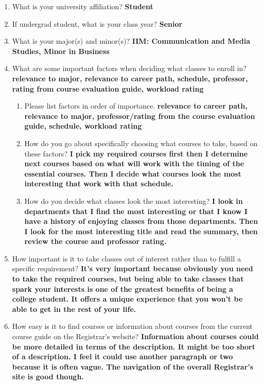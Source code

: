 \documentclass[12pt]{report}
\begin{document}
\begin{enumerate}
\item What is your university affiliation? \textbf{Student}
\item If undergrad student, what is your class year? \textbf{Senior}
\item What is your major(s) and minor(s)? \textbf{IIM: Communication and Media Studies, Minor in Business}
\item What are some important factors when deciding what classes to enroll in? \textbf{relevance to major, relevance to career path, schedule, professor, rating from course evaluation guide, workload rating}
	\begin{enumerate}
    \item Please list factors in order of importance. \textbf{relevance to career path, relevance to major, professor/rating from the course evaluation guide, schedule, workload rating}
    \item How do you go about specifically choosing what courses to take, based on these factors? \textbf{I pick my required courses first then I determine next courses based on what will work with the timing of the essential courses. Then I decide what courses look the most interesting that work with that schedule.}
    \item How do you decide what classes look the most interesting? \textbf{I look in departments that I find the most interesting or that I know I have a history of enjoying classes from those departments. Then I look for the most interesting title and read the summary, then review the course and professor rating.}
    \end{enumerate}
\item How important is it to take classes out of interest rather than to fulfill a specific requirement? \textbf{It’s very important because obviously you need to take the required courses, but being able to take classes that spark your interests is one of the greatest benefits of being a college student. It offers a unique experience that you won’t be able to get in the rest of your life.}
\item How easy is it to find courses or information about courses from the current course guide on the Registrar's website? \textbf{Information about courses could be more detailed in terms of the description. It might be too short of a description. I feel it could use another paragraph or two because it is often vague. The navigation of the overall Registrar’s site is good though.}
\end{enumerate}
\end{document}

